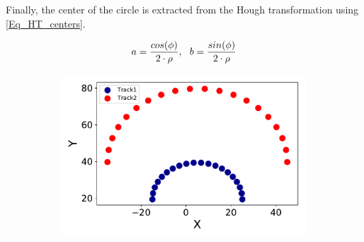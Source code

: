 Finally, the center of the circle is extracted from the Hough transformation using \cref{Eq_HT_centers}.


\begin{equation}
	a = {cos(\phi) \over {2 \cdot \rho}},
\,\,\,\,
	b = {sin(\phi) \over {2 \cdot \rho}}
\label{Eq_HT_centers}
\end{equation}


\begin{figure}[ht]
	\centering
	\begin{subfigure}[b]{0.3\textwidth}
        \includegraphics[width=\textwidth]{figures/circle.pdf}
        \caption{}


\end{subfigure}
\end{figure}
